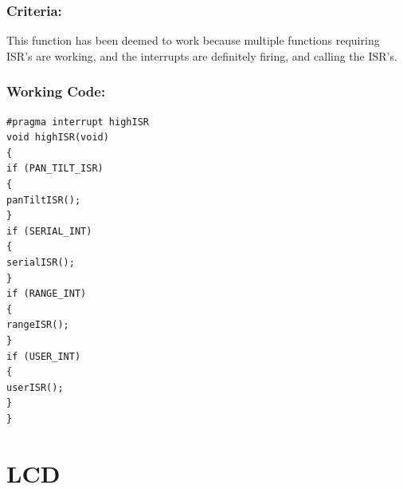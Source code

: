 \documentclass[]{report}
\begin{document}
\subsubsection{Criteria:}
This function has been deemed to work because multiple functions requiring ISR's are working, and the interrupts are definitely firing, and calling the ISR's.

\subsubsection{Working Code:}
\begin{lstlisting}
#pragma interrupt highISR
void highISR(void)
{
if (PAN_TILT_ISR)
{
panTiltISR();
}
if (SERIAL_INT)
{
serialISR();
}
if (RANGE_INT)
{
rangeISR();
}
if (USER_INT)
{
userISR();
}
}
\end{lstlisting}


\newpage
\section{LCD}
\end{document}
